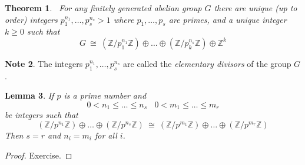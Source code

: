 \documentclass[12pt, letterpaper, oneside]{article}
\theoremstyle{plain}
\newtheorem{theorem}{Theorem}[section]
\newtheorem{lemma}[theorem]{Lemma}
\theoremstyle{definition}
\newtheorem{note}[theorem]{Note}
\newcommand{\Z}{{\mathbb Z}}
\newcommand{\vs}{\vskip 5mm}
\begin{document}
\begin{theorem}\ 
\label{THM_UNIQUEDECFINGENABGPS}
For any finitely generated abelian group $G$ there are unique (up to order) integers 
$p_{1}^{n_{1}}, \dots, p_{s}^{n_{s}}>1$ where $p_{1}, \dots, p_{s}$  are primes, and a unique integer 
$k\geq 0$ such that 
$$G\ \cong \ (\Z/p_{1}^{n_{1}}\Z)  \oplus  {\dots} \oplus  (\Z/p_{k}^{n_{s}}\Z)  \oplus  \Z^{k}$$

\end{theorem}


\vs

\begin{note}
The integers $p_{1}^{n_{1}}, \dots, p_{s}^{n_{s}}$
are called the \emph{elementary divisors} of the group $G$.
\end{note}


\vs\vs

\begin{lemma}
\label{LEMMA_ABPGPDECOMP}
If $p$ is a prime number and 
$$0 <n_{1} \leq \dots \leq n_{s}\ \  \ \ 0 < m_{1} \leq \dots \leq m_{r}$$ 
be integers such that 
$$
(\Z/p^{n_{1}}\Z) \oplus \dots \oplus (\Z/p^{n_{s}}\Z)\  \cong \ 
(\Z/p^{m_{1}}\Z) \oplus \dots \oplus (\Z/p^{m_{r}}\Z)
$$
Then $s=r$ and $n_{i} = m_{i}$ for all $i$.
\end{lemma}



\begin{proof}
Exercise.
\end{proof}


\vs\vs
\end{document}
